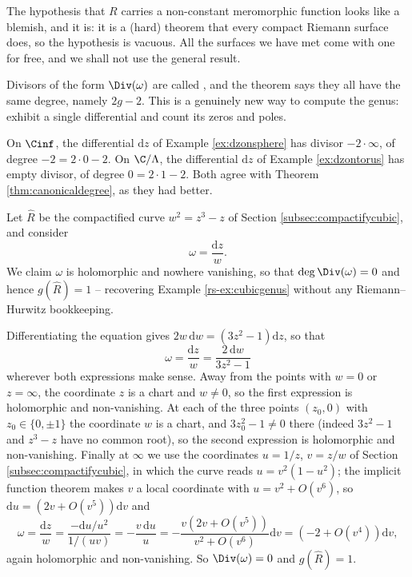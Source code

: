 \begin{remark}
	The hypothesis that $R$ carries a non-constant meromorphic function looks like a
	blemish, and it is: it is a (hard) theorem that every compact Riemann surface does, so
	the hypothesis is vacuous. All the surfaces we have met come with one for free, and we
	shall not use the general result.
\end{remark}

Divisors of the form $\Div(\omega)$ are called , and the theorem
says they all have the same degree, namely $2g-2$. This is a genuinely new way to compute
the genus: exhibit a single differential and count its zeros and poles.

\begin{example}
	On $\Cinf$, the differential $\mathrm{d}z$ of Example \ref{ex:dzonsphere} has divisor
	$-2\cdot\infty$, of degree $-2 = 2\cdot 0 - 2$. On $\C/\Lambda$, the differential
	$\mathrm{d}z$ of Example \ref{ex:dzontorus} has empty divisor, of degree $0 = 2\cdot 1 - 2$.
	Both agree with Theorem \ref{thm:canonicaldegree}, as they had better.
\end{example}

\begin{example}
	Let $\hat R$ be the compactified curve $w^2 = z^3-z$ of Section
	\ref{subsec:compactifycubic}, and consider
	$$
	\omega = \frac{\mathrm{d}z}{w}.
	$$
	We claim $\omega$ is holomorphic and nowhere vanishing, so that
	$\deg\Div(\omega) = 0$ and hence $g(\hat R) = 1$ -- recovering Example
	\ref{rs-ex:cubicgenus} without any Riemann--Hurwitz bookkeeping.

	Differentiating the equation gives $2w\,\mathrm{d}w = (3z^2-1)\mathrm{d}z$, so that
	$$
	\omega = \frac{\mathrm{d}z}{w} = \frac{2\,\mathrm{d}w}{3z^2-1}
	$$
	wherever both expressions make sense. Away from the points with $w = 0$ or
	$z = \infty$, the coordinate $z$ is a chart and $w \neq 0$, so the first expression is
	holomorphic and non-vanishing. At each of the three points $(z_0,0)$ with
	$z_0 \in \{0,\pm1\}$ the coordinate $w$ is a chart, and $3z_0^2 - 1 \neq 0$ there
	(indeed $3z^2-1$ and $z^3-z$ have no common root), so the second expression is
	holomorphic and non-vanishing. Finally at $\infty$ we use the coordinates
	$u = 1/z$, $v = z/w$ of Section \ref{subsec:compactifycubic}, in which the curve reads
	$u = v^2(1-u^2)$; the implicit function theorem makes $v$ a local coordinate with
	$u = v^2 + O(v^6)$, so $\mathrm{d}u = (2v + O(v^5))\mathrm{d}v$ and
	$$
	\omega = \frac{\mathrm{d}z}{w} = \frac{-\mathrm{d}u/u^2}{1/(uv)}
	= -\frac{v\,\mathrm{d}u}{u} = -\frac{v(2v+O(v^5))}{v^2 + O(v^6)}\mathrm{d}v
	= \left(-2 + O(v^4)\right)\mathrm{d}v,
	$$
	again holomorphic and non-vanishing. So $\Div(\omega) = 0$ and $g(\hat R) = 1$.
\end{example}

